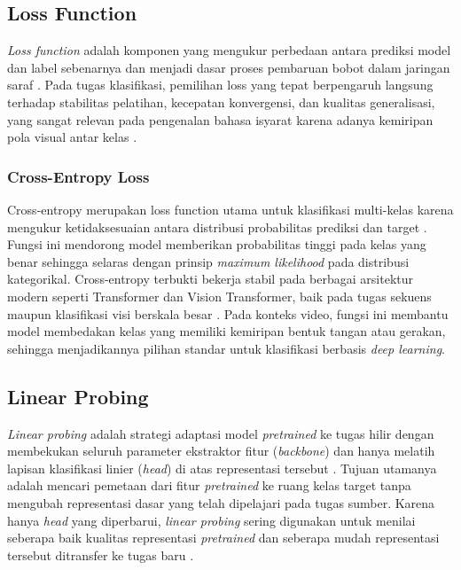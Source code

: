 \subsection{Loss Function}\label{II.Loss}
\textit{Loss function} adalah komponen yang mengukur perbedaan antara prediksi model dan label sebenarnya dan menjadi dasar proses pembaruan bobot dalam jaringan saraf \cite{IGoodfellow2016}. Pada tugas klasifikasi, pemilihan loss yang tepat berpengaruh langsung terhadap stabilitas pelatihan, kecepatan konvergensi, dan kualitas generalisasi, yang sangat relevan pada pengenalan bahasa isyarat karena adanya kemiripan pola visual antar kelas \cite{IGoodfellow2016}.

\subsubsection{Cross-Entropy Loss}
Cross-entropy merupakan loss function utama untuk klasifikasi multi-kelas karena mengukur ketidaksesuaian antara distribusi probabilitas prediksi dan target \cite{IGoodfellow2016}. Fungsi ini mendorong model memberikan probabilitas tinggi pada kelas yang benar sehingga selaras dengan prinsip \textit{maximum likelihood} pada distribusi kategorikal. Cross-entropy terbukti bekerja stabil pada berbagai arsitektur modern seperti Transformer dan Vision Transformer, baik pada tugas sekuens maupun klasifikasi visi berskala besar \cite{Vaswani2023,Dosovitskiy2021}. Pada konteks video, fungsi ini membantu model membedakan kelas yang memiliki kemiripan bentuk tangan atau gerakan, sehingga menjadikannya pilihan standar untuk klasifikasi berbasis \textit{deep learning}.

\subsection{Linear Probing}\label{II.LinearProbing}
\textit{Linear probing} adalah strategi adaptasi model \textit{pretrained} ke tugas hilir dengan membekukan seluruh parameter ekstraktor fitur (\textit{backbone}) dan hanya melatih lapisan klasifikasi linier (\textit{head}) di atas representasi tersebut \cite{Kumar2022}. Tujuan utamanya adalah mencari pemetaan dari fitur \textit{pretrained} ke ruang kelas target tanpa mengubah representasi dasar yang telah dipelajari pada tugas sumber. Karena hanya \textit{head} yang diperbarui, \textit{linear probing} sering digunakan untuk menilai seberapa baik kualitas representasi \textit{pretrained} dan seberapa mudah representasi tersebut ditransfer ke tugas baru \cite{Kumar2022,Yosinski2014}.\par

